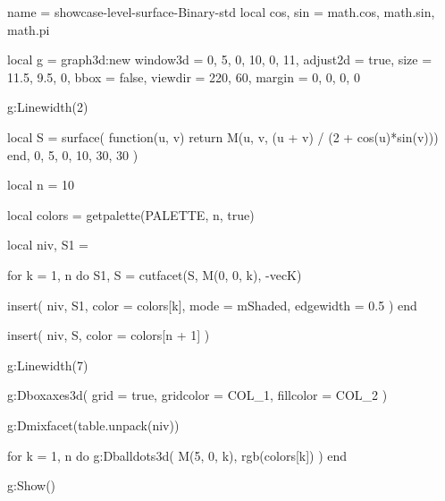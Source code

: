 \documentclass{tutodoc}
\newcommand{\PALETTE}{Binary}
\begin{document}
\vfill

\begin{luadraw}{name = showcase-level-surface-\PALETTE-std}
local cos, sin = math.cos, math.sin, math.pi

local g = graph3d:new{
  window3d = {0, 5, 0, 10, 0, 11},
  adjust2d = true,
  size     = {11.5, 9.5, 0},
  bbox     = false,
  viewdir  = {220, 60},
  margin   = {0, 0, 0, 0}
}

g:Linewidth(2)

local S = surface(
  function(u, v)
    return M(u, v, (u + v) / (2 + cos(u)*sin(v)))
  end,
  0, 5, 0, 10,
  {30, 30}
)

local n = 10

local colors = getpalette(PALETTE, n, true)

local niv, S1 = {}

for k = 1, n do
  S1, S = cutfacet(S, {M(0, 0, k), -vecK})

  insert(
    niv,
    {
      S1,
      {
        color     = colors[k],
        mode      = mShaded,
        edgewidth = 0.5
      }
    }
  )
end

insert(
  niv,
  {
    S,
    {color = colors[n + 1]}
  }
)

g:Linewidth(7)

g:Dboxaxes3d({
  grid      = true,
  gridcolor = COL_1,
  fillcolor = COL_2
})

g:Dmixfacet(table.unpack(niv))

for k = 1, n do
  g:Dballdots3d(
    M(5, 0, k),
    rgb(colors[k])
  )
end

g:Show()
\end{luadraw}
\end{document}
